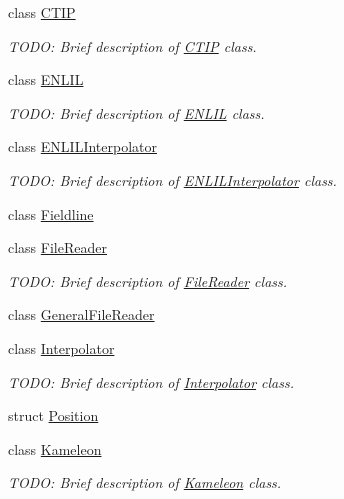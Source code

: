 \begin{DoxyCompactItemize}
\item 
class \hyperlink{classccmc_1_1_c_t_i_p}{C\-T\-I\-P}
\begin{DoxyCompactList}\small\item\em T\-O\-D\-O\-: Brief description of \hyperlink{classccmc_1_1_c_t_i_p}{C\-T\-I\-P} class. \end{DoxyCompactList}\item 
class \hyperlink{classccmc_1_1_e_n_l_i_l}{E\-N\-L\-I\-L}
\begin{DoxyCompactList}\small\item\em T\-O\-D\-O\-: Brief description of \hyperlink{classccmc_1_1_e_n_l_i_l}{E\-N\-L\-I\-L} class. \end{DoxyCompactList}\item 
class \hyperlink{classccmc_1_1_e_n_l_i_l_interpolator}{E\-N\-L\-I\-L\-Interpolator}
\begin{DoxyCompactList}\small\item\em T\-O\-D\-O\-: Brief description of \hyperlink{classccmc_1_1_e_n_l_i_l_interpolator}{E\-N\-L\-I\-L\-Interpolator} class. \end{DoxyCompactList}\item 
class \hyperlink{classccmc_1_1_fieldline}{Fieldline}
\item 
class \hyperlink{classccmc_1_1_file_reader}{File\-Reader}
\begin{DoxyCompactList}\small\item\em T\-O\-D\-O\-: Brief description of \hyperlink{classccmc_1_1_file_reader}{File\-Reader} class. \end{DoxyCompactList}\item 
class \hyperlink{classccmc_1_1_general_file_reader}{General\-File\-Reader}
\item 
class \hyperlink{classccmc_1_1_interpolator}{Interpolator}
\begin{DoxyCompactList}\small\item\em T\-O\-D\-O\-: Brief description of \hyperlink{classccmc_1_1_interpolator}{Interpolator} class. \end{DoxyCompactList}\item 
struct \hyperlink{structccmc_1_1_position}{Position}
\item 
class \hyperlink{classccmc_1_1_kameleon}{Kameleon}
\begin{DoxyCompactList}\small\item\em T\-O\-D\-O\-: Brief description of \hyperlink{classccmc_1_1_kameleon}{Kameleon} class. \end{DoxyCompactList}\item 

\end{DoxyCompactItemize}
